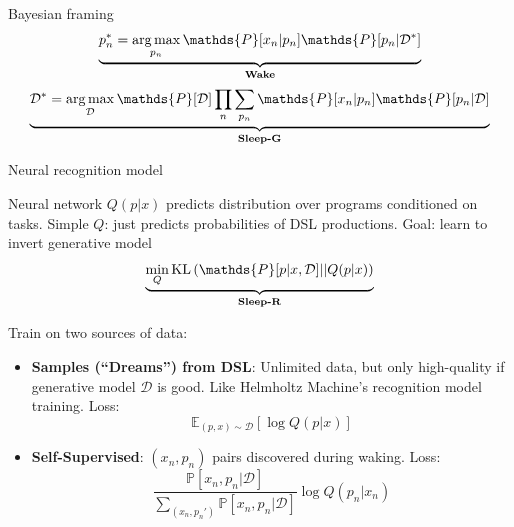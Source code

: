 \documentclass[final]{beamer}
\newlength{\onecolwid}
\DeclareMathOperator*{\argmax}{arg\,max} %
\newcommand{\expect}{\mathds{E}} %
\newcommand{\probability}{\mathds{P}} %
\begin{document}
\begin{frame}[t]
\begin{columns}[t]
\begin{column}{\onecolwid}
\begin{block}{Bayesian framing}
$$
\underbrace{p_n^* =   \argmax_{p_n}\probability[x_n|p_n]\probability[p_n|\mathcal{D}^*]}_{\text{\textbf{Wake}}}
$$
\begin{equation*}
\underbrace{\mathcal{D}^* = \argmax_{\mathcal{D}}    \probability[\mathcal{D}]\prod_n\sum_{p_n}\probability[x_n|p_n]\probability[p_n|\mathcal{D}]}_{\textbf{\text{Sleep-G}}}
  \end{equation*}

  
  
  

  

\end{block}

\begin{block}{Neural recognition model}

  Neural network $Q(p|x)$
  predicts distribution over programs conditioned on tasks.
  Simple $Q$: just predicts probabilities of DSL productions.  Goal: learn to invert generative model
$$\underbrace{\min_Q \text{KL}\left(\probability[p|x,\mathcal{D}] || Q(p|x)\right) }_{\text{\textbf{Sleep-R}}}$$


Train on two sources of data:

  \begin{itemize}
  \item \textbf{Samples (``Dreams'') from DSL}: Unlimited data, but only high-quality if generative model $\mathcal{D}$ is good. Like Helmholtz Machine's recognition model training. Loss:
    \begin{equation*}
\expect_{(p,x)\sim\mathcal{D} }\left[\log Q(p|x)\right]
      \end{equation*}
  \item \textbf{Self-Supervised}: $(x_n,p_n)$ pairs discovered during waking. Loss:
    \begin{equation*}
  \frac{\probability\left[x_n,p_n|\mathcal{D}\right]}{\sum_{(x_n,p_n')}\probability\left[x_n,p_n|\mathcal{D} \right]}\log Q(p_n|x_n)%
      \end{equation*}
  \end{itemize}
  

\end{block}






\end{column} %


\end{columns}
\end{frame}
\end{document}
